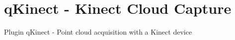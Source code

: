 \section{qKinect - Kinect Cloud Capture}
\label{subsection:qKinect}

Plugin qKinect - Point cloud acquisition with a Kinect device